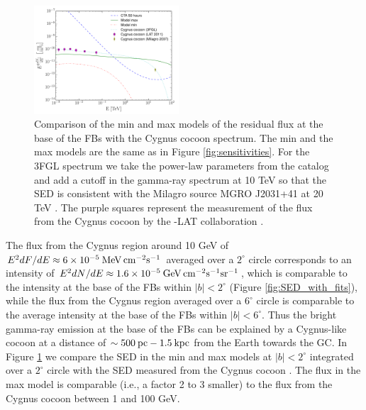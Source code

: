 \begin{figure}[h]
\centering
 \includegraphics[width=0.48\textwidth]{plots/low_lat_FB_CTA_cygnus.pdf}
 \caption{
 Comparison of the min and max models of the residual flux at the base of the FBs with the Cygnus cocoon spectrum. 
 The min and the max models are the same as in Figure \ref{fig:sensitivities}.
 For the 3FGL spectrum we take the power-law parameters from the catalog \citep{2015ApJS..218...23A}
 and add a cutoff in the gamma-ray spectrum at 10 TeV so that the SED is consistent with the Milagro source MGRO J2031+41 
 at 20 TeV \citep{2007ApJ...664L..91A}.
The purple squares represent the measurement of the flux from the Cygnus cocoon by the \Fermi-LAT collaboration
\citep{2011Sci...334.1103A}.
 }
 \label{fig:cygnus}
\end{figure}


The flux from the Cygnus region around 10 GeV of 
$E^2 {dF}/{dE} \approx 6\times 10^{-5}\: {\rm MeV\, cm^{-2} s^{-1}}$
averaged over a $2^\circ$ circle
corresponds to an intensity of $E^2 {dN}/{dE} \approx 1.6\times 10^{-5}\: {\rm GeV\, cm^{-2} s^{-1}sr^{-1}}$,
which is comparable to the intensity at the base of the FBs within $|b| < 2^\circ$ (Figure \ref{fig:SED_with_fits}),
while the flux from the Cygnus region averaged over a $6^\circ$ circle is comparable to the average intensity
at the base of the FBs within $|b| < 6^\circ$.
Thus the bright gamma-ray emission at the base of the FBs can be explained by a Cygnus-like 
cocoon at a distance of $\sim 500\:{\rm pc} - 1.5 \:{\rm kpc}$ from the Earth towards the GC.
In Figure \ref{fig:cygnus} we compare the SED in the min and max models at $|b| < 2^\circ$
integrated over a $2^\circ$ circle with the SED measured from the Cygnus cocoon 
\citep{2007ApJ...664L..91A, 2011Sci...334.1103A}.
The flux in the max model is comparable (i.e., a factor 2 to 3 smaller) 
to the flux from the Cygnus cocoon between 1 and 100 GeV.

